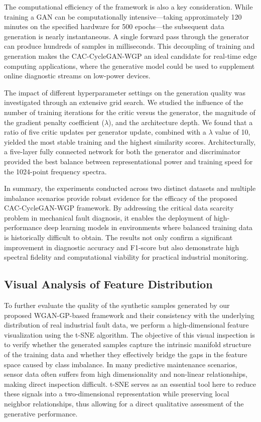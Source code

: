 \documentclass[twocolumn]{IEEEtran}
\begin{document}
The computational efficiency of the framework is also a key consideration. While training a GAN can be computationally intensive—taking approximately 120 minutes on the specified hardware for 500 epochs—the subsequent data generation is nearly instantaneous. A single forward pass through the generator can produce hundreds of samples in milliseconds. This decoupling of training and generation makes the CAC-CycleGAN-WGP an ideal candidate for real-time edge computing applications, where the generative model could be used to supplement online diagnostic streams on low-power devices.

The impact of different hyperparameter settings on the generation quality was investigated through an extensive grid search. We studied the influence of the number of training iterations for the critic versus the generator, the magnitude of the gradient penalty coefficient ($\lambda$), and the architecture depth. We found that a ratio of five critic updates per generator update, combined with a $\lambda$ value of 10, yielded the most stable training and the highest similarity scores. Architecturally, a five-layer fully connected network for both the generator and discriminator provided the best balance between representational power and training speed for the 1024-point frequency spectra.

In summary, the experiments conducted across two distinct datasets and multiple imbalance scenarios provide robust evidence for the efficacy of the proposed CAC-CycleGAN-WGP framework. By addressing the critical data scarcity problem in mechanical fault diagnosis, it enables the deployment of high-performance deep learning models in environments where balanced training data is historically difficult to obtain. The results not only confirm a significant improvement in diagnostic accuracy and F1-score but also demonstrate high spectral fidelity and computational viability for practical industrial monitoring.


\subsection{Visual Analysis of Feature Distribution}
\label{subsec:visual_analysis}

To further evaluate the quality of the synthetic samples generated by our proposed WGAN-GP-based framework and their consistency with the underlying distribution of real industrial fault data, we perform a high-dimensional feature visualization using the t-SNE \cite{Maaten2008} algorithm. The objective of this visual inspection is to verify whether the generated samples capture the intrinsic manifold structure of the training data and whether they effectively bridge the gaps in the feature space caused by class imbalance. In many predictive maintenance scenarios, sensor data often suffers from high dimensionality and non-linear relationships, making direct inspection difficult. t-SNE serves as an essential tool here to reduce these signals into a two-dimensional representation while preserving local neighbor relationships, thus allowing for a direct qualitative assessment of the generative performance.
\end{document}
